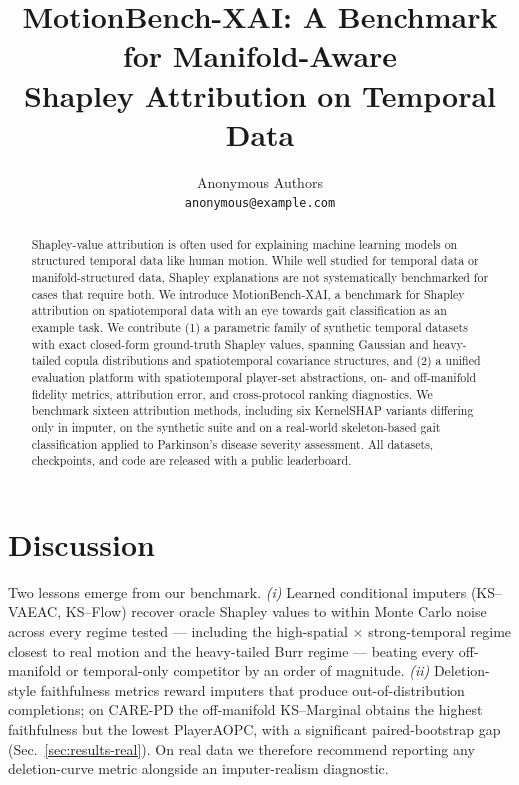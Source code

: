 \documentclass[10pt]{article}
\title{MotionBench-XAI: A Benchmark for Manifold-Aware\\
       Shapley Attribution on Temporal Data}
\author{%
  Anonymous Authors\\
  \texttt{anonymous@example.com}
}
\begin{document}
\maketitle

\begin{abstract}
Shapley-value attribution is often used for explaining machine learning models
on structured temporal data like human motion.  While well studied for temporal
data or manifold-structured data, Shapley explanations are not systematically
benchmarked for cases that require both.  We introduce MotionBench-XAI, a
benchmark for Shapley attribution on spatiotemporal data with an eye towards
gait classification as an example task.  We contribute (1) a parametric family
of synthetic temporal datasets with exact closed-form ground-truth Shapley
values, spanning Gaussian and heavy-tailed copula distributions and
spatiotemporal covariance structures, and (2) a unified evaluation platform
with spatiotemporal player-set abstractions, on- and off-manifold fidelity
metrics, attribution error, and cross-protocol ranking diagnostics.  We
benchmark sixteen attribution methods, including six KernelSHAP variants
differing only in imputer, on the synthetic suite and on a real-world
skeleton-based gait classification applied to Parkinson's disease severity
assessment.  All datasets, checkpoints, and code are released with a public
leaderboard.
\end{abstract}








\section{Discussion}
\label{sec:discussion}

Two lessons emerge from our benchmark.
\emph{(i)} Learned conditional imputers (KS--VAEAC, KS--Flow) recover
oracle Shapley values to within Monte Carlo noise across every regime
tested --- including the high-spatial $\times$ strong-temporal regime
closest to real motion and the heavy-tailed Burr regime --- beating
every off-manifold or temporal-only competitor by an order of magnitude.
\emph{(ii)} Deletion-style faithfulness metrics reward imputers that
produce out-of-distribution completions; on CARE-PD the off-manifold
KS--Marginal obtains the highest faithfulness but the lowest PlayerAOPC,
with a significant paired-bootstrap gap (Sec.~\ref{sec:results-real}).
On real data we therefore recommend reporting any deletion-curve metric
alongside an imputer-realism diagnostic.
\end{document}
